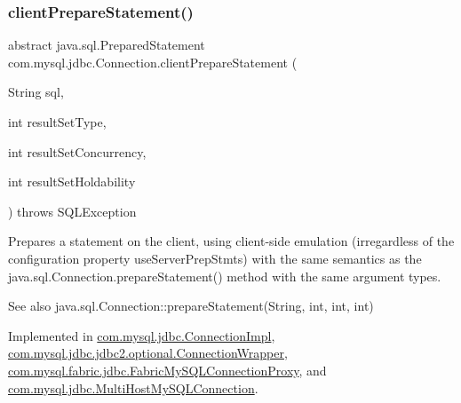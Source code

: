 \subsubsection{\texorpdfstring{client\+Prepare\+Statement()}{clientPrepareStatement()}\hspace{0.1cm}{\footnotesize\ttfamily [5/6]}}
{\footnotesize\ttfamily abstract java.\+sql.\+Prepared\+Statement com.\+mysql.\+jdbc.\+Connection.\+client\+Prepare\+Statement (\begin{DoxyParamCaption}\item[{String}]{sql,  }\item[{int}]{result\+Set\+Type,  }\item[{int}]{result\+Set\+Concurrency,  }\item[{int}]{result\+Set\+Holdability }\end{DoxyParamCaption}) throws S\+Q\+L\+Exception\hspace{0.3cm}{\ttfamily [abstract]}}

Prepares a statement on the client, using client-\/side emulation (irregardless of the configuration property \textquotesingle{}use\+Server\+Prep\+Stmts\textquotesingle{}) with the same semantics as the java.\+sql.\+Connection.\+prepare\+Statement() method with the same argument types.

\begin{DoxySeeAlso}{See also}
java.\+sql.\+Connection\+::prepare\+Statement(\+String, int, int, int) 
\end{DoxySeeAlso}


Implemented in \mbox{\hyperlink{classcom_1_1mysql_1_1jdbc_1_1_connection_impl_ab4f506b0ae8623a91e4aea7f33bb2da5}{com.\+mysql.\+jdbc.\+Connection\+Impl}}, \mbox{\hyperlink{classcom_1_1mysql_1_1jdbc_1_1jdbc2_1_1optional_1_1_connection_wrapper_a546e049a9b2f6741d15e1e1bdbe31292}{com.\+mysql.\+jdbc.\+jdbc2.\+optional.\+Connection\+Wrapper}}, \mbox{\hyperlink{classcom_1_1mysql_1_1fabric_1_1jdbc_1_1_fabric_my_s_q_l_connection_proxy_af87ed2e4ae29bbf51b90adf202a61c49}{com.\+mysql.\+fabric.\+jdbc.\+Fabric\+My\+S\+Q\+L\+Connection\+Proxy}}, and \mbox{\hyperlink{classcom_1_1mysql_1_1jdbc_1_1_multi_host_my_s_q_l_connection_a5b3d4ce08f970c43ce42d939eae35b38}{com.\+mysql.\+jdbc.\+Multi\+Host\+My\+S\+Q\+L\+Connection}}.

\mbox{\label{interfacecom_1_1mysql_1_1jdbc_1_1_connection_a452a8703aca3c45fdafe3e1a5093b8b5}} 
